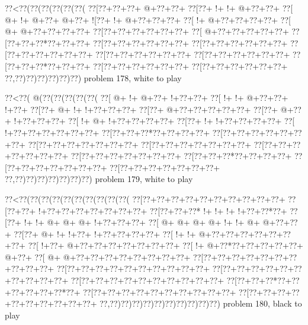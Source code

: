 \vbox{\vbox{\goo
\0??<\0??(\0??(\0??(\0??(\0??(\0??(
\0??[\0??+\0??+\0??+\- @+\0??+\0??+
\0??[\0??+\- !+\- !+\- @+\0??+\0??+
\0??[\- @+\- !+\- @+\0??+\- @+\0??+
\- ![\0??+\- !+\- @+\0??+\0??+\0??+
\0??[\- !+\- @+\0??+\0??+\0??+\0??+
\0??[\- @+\- @+\0??+\0??+\0??+\0??+
\0??[\0??+\0??+\0??+\0??+\0??+\0??+
\0??[\- @+\0??+\0??+\0??+\0??+\0??+
\0??[\0??+\0??+\0??*\0??+\0??+\0??+
\0??[\0??+\0??+\0??+\0??+\0??+\0??+
\0??[\0??+\0??+\0??+\0??+\0??+\0??+
\0??[\0??+\0??+\0??+\0??+\0??+\0??+
\0??[\0??+\0??+\0??+\0??+\0??+\0??+
\0??[\0??+\0??+\0??+\0??+\0??+\0??+
\0??[\0??+\0??+\0??*\0??+\0??+\0??+
\0??[\0??+\0??+\0??+\0??+\0??+\0??+
\0??[\0??+\0??+\0??+\0??+\0??+\0??+
\0??,\0??)\0??)\0??)\0??)\0??)\0??)
}
\hfil problem 178, white to play\hfil\break
}

\vbox{\vbox{\goo
\0??<\0??(\- @(\0??(\0??(\0??(\0??(\0??(
\0??[\- @+\- !+\- @+\0??+\- !+\0??+\0??+
\0??[\- !+\- !+\- @+\0??+\0??+\- !+\0??+
\0??[\0??+\- @+\- !+\- !+\0??+\0??+\0??+
\0??[\0??+\- @+\0??+\0??+\0??+\0??+\0??+
\0??[\0??+\- @+\0??+\- !+\0??+\0??+\0??+
\0??[\- !+\- @+\- !+\0??+\0??+\0??+\0??+
\0??[\0??+\- !+\- !+\0??+\0??+\0??+\0??+
\0??[\- !+\0??+\0??+\0??+\0??+\0??+\0??+
\0??[\0??+\0??+\0??*\0??+\0??+\0??+\0??+
\0??[\0??+\0??+\0??+\0??+\0??+\0??+\0??+
\0??[\0??+\0??+\0??+\0??+\0??+\0??+\0??+
\0??[\0??+\0??+\0??+\0??+\0??+\0??+\0??+
\0??[\0??+\0??+\0??+\0??+\0??+\0??+\0??+
\0??[\0??+\0??+\0??+\0??+\0??+\0??+\0??+
\0??[\0??+\0??+\0??*\0??+\0??+\0??+\0??+
\0??[\0??+\0??+\0??+\0??+\0??+\0??+\0??+
\0??[\0??+\0??+\0??+\0??+\0??+\0??+\0??+
\0??,\0??)\0??)\0??)\0??)\0??)\0??)\0??)
}
\hfil problem 179, white to play\hfil\break
}

\vbox{\vbox{\goo
\0??<\0??(\0??(\0??(\0??(\0??(\0??(\0??(\0??(\0??(\0??(
\0??[\0??+\0??+\0??+\0??+\0??+\0??+\0??+\0??+\0??+\0??+
\0??[\0??+\0??+\- !+\0??+\0??+\0??+\0??+\0??+\0??+\0??+
\0??[\0??+\0??+\0??*\- !+\- !+\- !+\- !+\0??+\0??*\0??+
\0??[\0??+\- !+\- !+\- @+\- @+\- @+\- !+\0??+\0??+\0??+
\0??[\- @+\- @+\- @+\- @+\- !+\- !+\- @+\- @+\0??+\0??+
\0??[\0??+\- @+\- !+\- !+\0??+\- !+\0??+\0??+\0??+\0??+
\0??[\- !+\- !+\- @+\0??+\0??+\0??+\0??+\0??+\0??+\0??+
\0??[\- !+\0??+\- @+\0??+\0??+\0??+\0??+\0??+\0??+\0??+
\0??[\- !+\- @+\0??*\0??+\0??+\0??+\0??+\0??+\- @+\0??+
\0??[\- @+\- @+\0??+\0??+\0??+\0??+\0??+\0??+\0??+\0??+
\0??[\0??+\0??+\0??+\0??+\0??+\0??+\0??+\0??+\0??+\0??+
\0??[\0??+\0??+\0??+\0??+\0??+\0??+\0??+\0??+\0??+\0??+
\0??[\0??+\0??+\0??+\0??+\0??+\0??+\0??+\0??+\0??+\0??+
\0??[\0??+\0??+\0??+\0??+\0??+\0??+\0??+\0??+\0??+\0??+
\0??[\0??+\0??+\0??*\0??+\0??+\0??+\0??+\0??+\0??*\0??+
\0??[\0??+\0??+\0??+\0??+\0??+\0??+\0??+\0??+\0??+\0??+
\0??[\0??+\0??+\0??+\0??+\0??+\0??+\0??+\0??+\0??+\0??+
\0??,\0??)\0??)\0??)\0??)\0??)\0??)\0??)\0??)\0??)\0??)
}
\hfil problem 180, black to play\hfil\break
}

